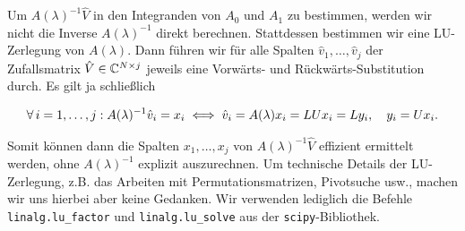 Um $A(\lambda)^{-1} \hat V$ in den Integranden von $A_0$ und $A_1$ zu bestimmen, werden wir nicht
die Inverse $A(\lambda)^{-1}$ direkt berechnen.
Stattdessen bestimmen wir eine LU-Zerlegung von $A(\lambda)$.
Dann führen wir für alle Spalten $\hat v_1, \dots, \hat v_j$ der Zufallsmatrix $\hat V \in \mathbb{C}^{N \times j}$ jeweils eine Vorwärts- und Rückwärts-Substitution durch.
Es gilt ja schließlich

\begin{align*}
    \forall \, i = 1, \dots, j:
        A(\lambda)^{-1} \hat v_i = x_i
        \iff
        \hat v_i = A(\lambda) x_i = L U x_i = L y_i,
        \quad
        y_i = U x_i.
\end{align*}

Somit können dann die Spalten $x_1, \dots, x_j$ von $A(\lambda)^{-1} \hat V$ effizient ermittelt werden, ohne $A(\lambda)^{-1}$ explizit auszurechnen.
Um technische Details der LU-Zerlegung, z.B. das Arbeiten mit Permutationsmatrizen, Pivotsuche usw., machen wir uns hierbei aber keine Gedanken.
Wir verwenden lediglich die Befehle \texttt{linalg.lu\_factor} und \texttt{linalg.lu\_solve} aus der \texttt{scipy}-Bibliothek.
